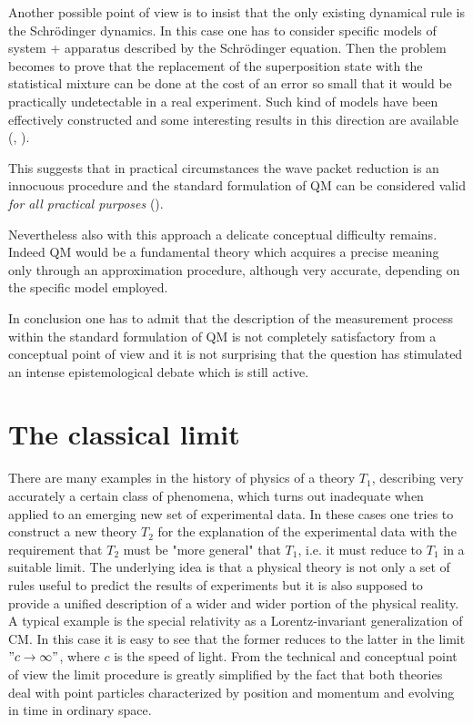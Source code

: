 \documentclass[12pt,reqno]{amsart}
\newcommand{\n}{\relax}
\newcommand{\vs}{\medskip}
\numberwithin{equation}{section}
\begin{document}
\n
Another possible point of view is to insist that the only existing dynamical rule is the Schr\"{o}dinger dynamics. In this case one has to consider specific models of system + apparatus described by the Schr\"{o}dinger equation. Then the problem becomes to prove that the replacement of the superposition state with the statistical mixture can be done at the cost of an error so small that it would be practically undetectable in a real experiment. Such kind of models have been effectively constructed and some interesting results in this direction are available (\cite{he}, \cite{se}).

\n
This suggests that in practical circumstances the wave packet reduction is an innocuous procedure and  the standard formulation of QM can be considered valid {\em for all practical purposes} (\cite{b}). 

\n
Nevertheless also with this approach  a delicate conceptual difficulty remains.  Indeed QM would be a fundamental theory which acquires a precise meaning only through an approximation procedure, although very accurate, depending on the specific model employed.

\n
In conclusion one has to admit that the description of the measurement process within the standard formulation of QM is not completely satisfactory 
from a conceptual point of view and it is not surprising that the question has stimulated an   intense epistemological debate  which is still active.




















\vs
\vs
\section{The classical limit}

\vs
\n
There are many examples in  the history of physics of a theory $T_1$, describing very  accurately a certain class of phenomena, which turns out inadequate when applied to an emerging new set of experimental data. In these cases one tries to construct a new theory $T_2$ for the explanation of the experimental data with the  requirement  that $T_2$ must be "more general" that $T_1$, i.e. it must  reduce to $T_1$  in a suitable limit. The underlying idea is that  a physical theory is not only a set of rules useful to predict the results of experiments but it is also supposed to provide a  unified description of a wider and wider portion  of the physical reality. 
A typical example is the special relativity as a Lorentz-invariant  generalization of CM. In this case it is easy to see that the former reduces to the latter in the limit $" c \rightarrow \infty"$, where $c$ is the speed of light. From the technical and conceptual point of view the limit procedure is greatly simplified  by the fact that both theories deal with  point particles  characterized by position and momentum and evolving in time in ordinary space. 
\end{document}
